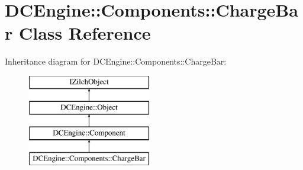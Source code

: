 \hypertarget{classDCEngine_1_1Components_1_1ChargeBar}{\section{D\-C\-Engine\-:\-:Components\-:\-:Charge\-Bar Class Reference}
\label{classDCEngine_1_1Components_1_1ChargeBar}
}
Inheritance diagram for D\-C\-Engine\-:\-:Components\-:\-:Charge\-Bar\-:\begin{figure}[H]
\begin{center}
\leavevmode
\includegraphics[height=4.000000cm]{classDCEngine_1_1Components_1_1ChargeBar}
\end{center}
\end{figure}
